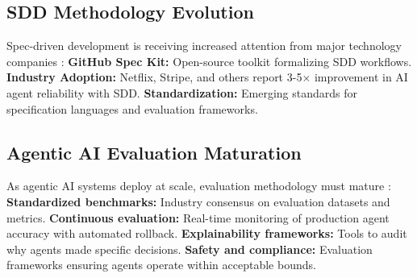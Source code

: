 \documentclass[11pt,a4paper]{article}
\begin{document}
\subsection{SDD Methodology Evolution}
Spec-driven development is receiving increased attention from major technology companies \cite{jetbrains2025}:
\textbf{GitHub Spec Kit:} Open-source toolkit formalizing SDD workflows. \newline
\textbf{Industry Adoption:} Netflix, Stripe, and others report 3-5$\times$ improvement in AI agent reliability with SDD. \newline
\textbf{Standardization:} Emerging standards for specification languages and evaluation frameworks.

\subsection{Agentic AI Evaluation Maturation}
As agentic AI systems deploy at scale, evaluation methodology must mature \cite{tableau2025}:
\textbf{Standardized benchmarks:} Industry consensus on evaluation datasets and metrics. \newline
\textbf{Continuous evaluation:} Real-time monitoring of production agent accuracy with automated rollback. \newline
\textbf{Explainability frameworks:} Tools to audit why agents made specific decisions. \newline
\textbf{Safety and compliance:} Evaluation frameworks ensuring agents operate within acceptable bounds.
\end{document}
